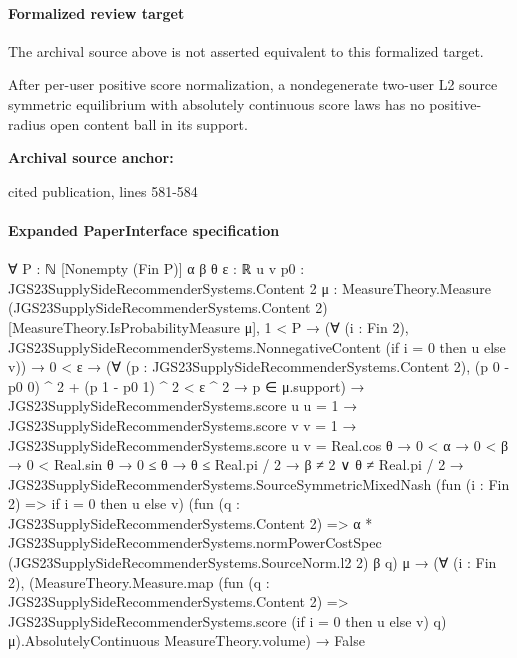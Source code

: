 \documentclass[10pt]{article}
\begin{document}
\paragraph{Formalized review target}
The archival source above is not asserted equivalent to this formalized target.
\begin{ReviewVerbatim}
After per-user positive score normalization, a nondegenerate two-user L2 source symmetric equilibrium with absolutely continuous score laws has no positive-radius open content ball in its support.
\end{ReviewVerbatim}

\textbf{Archival source anchor:} {\footnotesize\raggedright cited publication, lines 581-\allowbreak{}584\par}
\paragraph{Expanded PaperInterface specification}
\begin{ReviewVerbatim}
∀ {P : ℕ} [Nonempty (Fin P)] {α β θ ε : ℝ} {u v p0 : JGS23SupplySideRecommenderSystems.Content 2}
  {μ : MeasureTheory.Measure (JGS23SupplySideRecommenderSystems.Content 2)} [MeasureTheory.IsProbabilityMeasure μ],
  1 < P →
    (∀ (i : Fin 2), JGS23SupplySideRecommenderSystems.NonnegativeContent (if i = 0 then u else v)) →
      0 < ε →
        (∀ (p : JGS23SupplySideRecommenderSystems.Content 2),
            (p 0 - p0 0) ^ 2 + (p 1 - p0 1) ^ 2 < ε ^ 2 → p ∈ μ.support) →
          JGS23SupplySideRecommenderSystems.score u u = 1 →
            JGS23SupplySideRecommenderSystems.score v v = 1 →
              JGS23SupplySideRecommenderSystems.score u v = Real.cos θ →
                0 < α →
                  0 < β →
                    0 < Real.sin θ →
                      0 ≤ θ →
                        θ ≤ Real.pi / 2 →
                          β ≠ 2 ∨ θ ≠ Real.pi / 2 →
                            JGS23SupplySideRecommenderSystems.SourceSymmetricMixedNash
                                (fun (i : Fin 2) => if i = 0 then u else v)
                                (fun (q : JGS23SupplySideRecommenderSystems.Content 2) =>
                                  α *
                                    JGS23SupplySideRecommenderSystems.normPowerCostSpec
                                      (JGS23SupplySideRecommenderSystems.SourceNorm.l2 2) β q)
                                μ →
                              (∀ (i : Fin 2),
                                  (MeasureTheory.Measure.map
                                        (fun (q : JGS23SupplySideRecommenderSystems.Content 2) =>
                                          JGS23SupplySideRecommenderSystems.score (if i = 0 then u else v) q)
                                        μ).AbsolutelyContinuous
                                    MeasureTheory.volume) →
                                False
\end{ReviewVerbatim}
\end{document}
